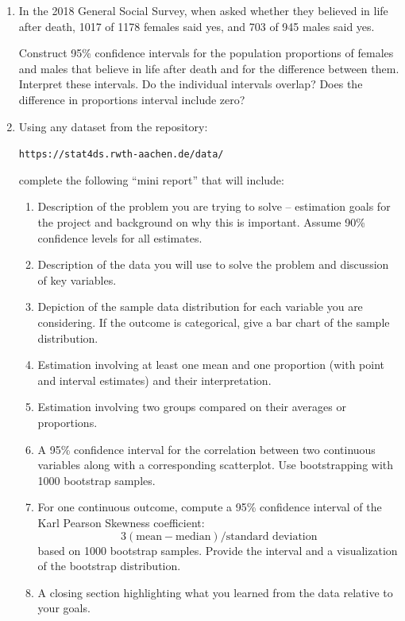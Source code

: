 \documentclass[12pt]{article}
\begin{document}
\begin{enumerate}
\item[(a) 15 points] In the 2018 General Social Survey, when asked whether they believed in life after death, 1017 of 1178 females said yes, and 703 of 945 males said yes.

Construct 95\% confidence intervals for the population proportions of females and males that believe in life after death and for the difference between them. Interpret these intervals. Do the individual intervals overlap? Does the difference in proportions interval include zero?

\item[(b) 25 points] Using any dataset from the repository:

\texttt{https://stat4ds.rwth-aachen.de/data/}

complete the following ``mini report'' that will include:

\begin{enumerate}
\item[(i)] Description of the problem you are trying to solve -- estimation goals for the project and background on why this is important. Assume 90\% confidence levels for all estimates.
\item[(ii)] Description of the data you will use to solve the problem and discussion of key variables.
\item[(iii)] Depiction of the sample data distribution for each variable you are considering. If the outcome is categorical, give a bar chart of the sample distribution.
\item[(iv)] Estimation involving at least one mean and one proportion (with point and interval estimates) and their interpretation.
\item[(v)] Estimation involving two groups compared on their averages or proportions.
\item[(vi)] A 95\% confidence interval for the correlation between two continuous variables along with a corresponding scatterplot. Use bootstrapping with 1000 bootstrap samples.
\item[(vii)] For one continuous outcome, compute a 95\% confidence interval of the Karl Pearson Skewness coefficient:
\[
3(\text{mean}-\text{median})/\text{standard deviation}
\]
based on 1000 bootstrap samples. Provide the interval and a visualization of the bootstrap distribution.
\item[(viii)] A closing section highlighting what you learned from the data relative to your goals.
\end{enumerate}

\end{enumerate}
\end{document}
